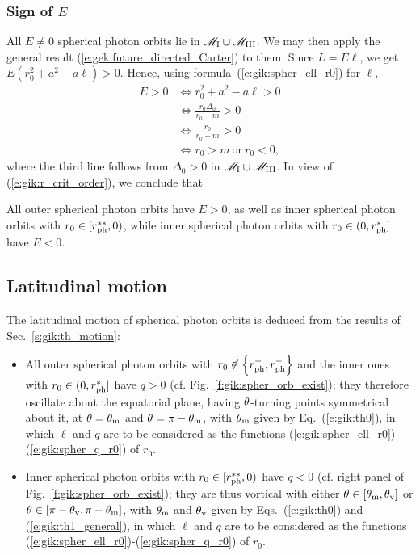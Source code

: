 \subsubsection{Sign of $E$}

All $E\neq 0$ spherical photon orbits lie in $\mathscr{M}_{\rm I}\cup\mathscr{M}_{\rm III}$. We may then apply
the general result (\ref{e:gek:future_directed_Carter}) to them. Since $L = E \ell$, we get
$E (r_0^2 + a^2 - a \ell) > 0$.
Hence, using formula~(\ref{e:gik:spher_ell_r0}) for $\ell$,
\begin{align}
E > 0 & \iff r_0^2 + a^2 - a \ell > 0 \nonumber \\
      & \iff \frac{r_0 \Delta_0}{r_0 - m} > 0 \nonumber \\
      & \iff \frac{r_0}{r_0 - m} > 0  \nonumber \\
      & \iff r_0 > m \ \mbox{or}\ r_0 < 0 , \nonumber
\end{align}
where the third line follows from $\Delta_0 > 0$ in $\mathscr{M}_{\rm I}\cup\mathscr{M}_{\rm III}$.
In view of (\ref{e:gik:r_crit_order}), we conclude that
\begin{greybox}
All outer spherical photon orbits have $E>0$, as well as inner spherical photon
orbits with $r_0\in[r_{\rm ph}^{**}, 0)$, %
while inner spherical photon orbits with $r_0\in(0, r_{\rm ph}^*]$
have $E<0$.
\end{greybox}

\subsection{Latitudinal motion} \label{s:gik:spher_latitudinal}

The latitudinal motion of spherical photon orbits is
deduced from the results of Sec.~\ref{s:gik:th_motion}:
\begin{itemize}
\item All outer spherical photon orbits with $r_0\not\in \left\{r_{\rm ph}^+, r_{\rm ph}^-\right\}$ and the inner ones with $r_0\in (0, r_{\rm ph}^{*}]$
have $q>0$ (cf. Fig.~\ref{f:gik:spher_orb_exist}); they
therefore oscillate about the equatorial plane, having $\theta$-turning points
symmetrical about it, at $\theta=\theta_{\rm m}$ and $\theta=\pi-\theta_{\rm m}$, with
$\theta_{\rm m}$ given by Eq.~(\ref{e:gik:th0}),
in which $\ell$ and $q$ are to be considered as the functions
(\ref{e:gik:spher_ell_r0})-(\ref{e:gik:spher_q_r0}) of $r_0$.
\item Inner spherical photon orbits with $r_0 \in [r_{\rm ph}^{**}, 0)$ %
have $q<0$ (cf. right panel of Fig.~\ref{f:gik:spher_orb_exist}); they are thus vortical
with either $\theta\in[\theta_{\rm m}, \theta_{\rm v}]$ or $\theta\in[\pi-\theta_{\rm v}, \pi-\theta_{\rm m}]$, with
$\theta_{\rm m}$ and $\theta_{\rm v}$ given by Eqs.~(\ref{e:gik:th0}) and (\ref{e:gik:th1_general}), in which
$\ell$ and $q$ are to be considered as the functions
(\ref{e:gik:spher_ell_r0})-(\ref{e:gik:spher_q_r0}) of $r_0$.
\end{itemize}



